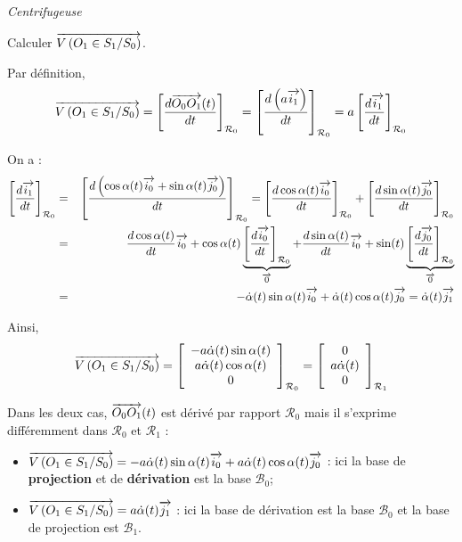 \documentclass[10pt,oneside]{article}
\begin{document}
\begin{exemple}
\textit{Centrifugeuse}

Calculer $\overrightarrow{V\left( {O_1} \in {S_1}/{S_0}\right)}$.

Par définition, 
$$
\overrightarrow{V\left( {O_1} \in {S_1}/{S_0}\right)} 
= \left[\dfrac{d\overrightarrow{O_0O_1}(t)}{dt}\right]_{\mathcal{R}_0}
= \left[\dfrac{d \left(a \overrightarrow{i_1}\right) }{dt}\right]_{\mathcal{R}_0}
= a \left[\dfrac{d  \overrightarrow{i_1} }{dt}\right]_{\mathcal{R}_0}
$$

On a :
\begin{eqnarray*}
\left[\dfrac{d  \overrightarrow{i_1} }{dt}\right]_{\mathcal{R}_0}
&=&\left[\dfrac{d \left(\cos\alpha(t)\overrightarrow{i_0}+\sin\alpha(t)\overrightarrow{j_0} \right)}{dt}\right]_{\mathcal{R}_0}
=\left[\dfrac{d  \cos\alpha(t)\overrightarrow{i_0}}{dt}\right]_{\mathcal{R}_0}
+\left[\dfrac{d  \sin\alpha(t)\overrightarrow{j_0} }{dt}\right]_{\mathcal{R}_0}\\
& = & 
\dfrac{d \cos\alpha(t)}{dt} \overrightarrow{i_0}  
+\cos\alpha(t)\underbrace{\left[\dfrac{d  \overrightarrow{i_0}}{dt}\right]_{\mathcal{R}_0}}_{\overrightarrow{0}}
+\dfrac{d \sin\alpha(t)}{dt} \overrightarrow{i_0}  
+\sin(t)\underbrace{\left[\dfrac{d  \overrightarrow{j_0}}{dt}\right]_{\mathcal{R}_0}}_{\overrightarrow{0}}\\
& = & -\dot{\alpha}(t)\sin\alpha(t) \overrightarrow{i_0}   + \dot{\alpha}(t)\cos\alpha(t) \overrightarrow{j_0}  = 
\dot{\alpha}(t)\overrightarrow{j_1}
\end{eqnarray*}

Ainsi,
$$
\overrightarrow{V\left( {O_1} \in {S_1}/{S_0}\right)} 
= \left[\begin{array}{c} 
-a\dot{\alpha}(t)\sin\alpha(t) \\
a \dot{\alpha}(t)\cos\alpha(t) \\
0 \end{array}\right]_{\mathcal{R}_0}
=\left[\begin{array}{c} 0 \\ a\dot{\alpha}(t) \\ 0\end{array}\right]_{\mathcal{R}_1}
$$

Dans les deux cas, $\overrightarrow{O_0O_1}(t)$ est dérivé par rapport $\mathcal{R}_0$ mais il s'exprime différemment dans $\mathcal{R}_0$ et $\mathcal{R}_1$ :
\begin{itemize}
\item $\overrightarrow{V\left( {O_1} \in {S_1}/{S_0}\right)} = -a\dot{\alpha}(t)\sin\alpha(t) \overrightarrow{i_0}   + a\dot{\alpha}(t) \cos\alpha(t) \overrightarrow{j_0}$ : ici la base de \textbf{projection} et de \textbf{dérivation} est la base $\mathcal{B}_0$;
\item $\overrightarrow{V\left( {O_1} \in {S_1}/{S_0}\right)} = a\dot{\alpha}(t)\overrightarrow{j_1}$ : ici la base de dérivation est la base $\mathcal{B}_0$ et la base de projection est $\mathcal{B}_1$.
\end{itemize}

\end{exemple}
\end{document}
